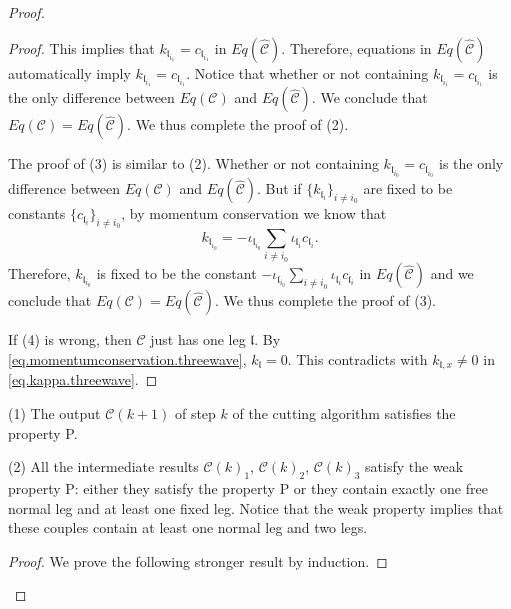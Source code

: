 \begin{proof}
\begin{proof}
This implies that $k_{\mathfrak{l}_{i_1}}=c_{\mathfrak{l}_{i_1}}$ in $Eq(\widehat{\mathcal{C}})$. Therefore, equations in $Eq(\widehat{\mathcal{C}})$ automatically imply $k_{\mathfrak{l}_{i_1}}=c_{\mathfrak{l}_{i_1}}$. Notice that whether or not containing $k_{\mathfrak{l}_{i_1}}=c_{\mathfrak{l}_{i_1}}$ is the only difference between $Eq(\mathcal{C})$ and $Eq(\widehat{\mathcal{C}})$. We conclude that $Eq(\mathcal{C})=Eq(\widehat{\mathcal{C}})$. We thus complete the proof of (2).

The proof of (3) is similar to (2). Whether or not containing $k_{\mathfrak{l}_{i_0}}=c_{\mathfrak{l}_{i_0}}$ is the only difference between $Eq(\mathcal{C})$ and $Eq(\widehat{\mathcal{C}})$. But if $\{k_{\mathfrak{l}_{i}}\}_{i\ne i_0}$ are fixed to be constants $\{c_{\mathfrak{l}_{i}}\}_{i\ne i_0}$, by momentum conservation we know that 
\begin{equation}
     k_{\mathfrak{l}_{i_0}}=-\iota_{\mathfrak{l}_{i_0}}\sum_{i\ne i_0} \iota_{\mathfrak{l}_i}c_{\mathfrak{l}_i}.
\end{equation}
Therefore, $k_{\mathfrak{l}_{i_0}}$ is fixed to be the constant $-\iota_{\mathfrak{l}_{i_0}}\sum_{i\ne i_0} \iota_{\mathfrak{l}_i}c_{\mathfrak{l}_i}$ in $Eq(\widehat{\mathcal{C}})$ and we conclude that $Eq(\mathcal{C})=Eq(\widehat{\mathcal{C}})$. We thus complete the proof of (3).

If (4) is wrong, then $\mathcal{C}$ just has one leg $\mathfrak{l}$. By \eqref{eq.momentumconservation.threewave}, $k_{\mathfrak{l}}=0$. This contradicts with $k_{\mathfrak{l},x}\ne 0$ in \eqref{eq.kappa.threewave}.
\end{proof}







\begin{lem}\label{lem.normleg} %
(1) The output $\mathcal{C}(k+1)$ of step $k$ of the cutting algorithm satisfies the property P.

(2) All the intermediate results $\mathcal{C}(k)_1$, $\mathcal{C}(k)_2$, $\mathcal{C}(k)_3$ satisfy the weak property P: either they satisfy the property P or they contain exactly one free normal leg and at least one fixed leg. Notice that the weak property implies that these couples contain at least one normal leg and two legs.
\end{lem}
\begin{proof}
We prove the following stronger result by induction.


\end{proof}
\end{proof}
